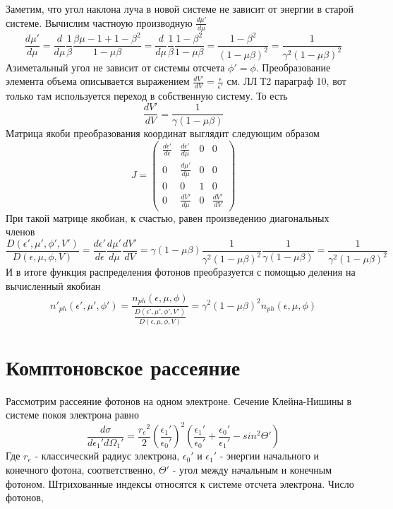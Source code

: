 \documentclass[a4paper,12pt]{jpconf}
\begin{document}
	Заметим, что угол наклона луча в новой системе не зависит от энергии в старой системе. Вычислим частноую производную $\frac{d\mu'}{d\mu}$
	\begin{equation}
		\frac{d\mu'}{d\mu}=\frac{d}{d\mu}\frac{1}{\beta}\frac{\beta\mu-1+1-\beta^2}{1-\mu\beta}=\frac{d}{d\mu}\frac{1}{\beta}\frac{1-\beta^2}{1-\mu\beta}=\frac{1-\beta^2}{(1-\mu\beta)^2}=\frac{1}{\gamma^2(1-\mu\beta)^2}
	\end{equation}
	Азиметальный угол не зависит от системы отсчета $\phi' = \phi$. Преобразование элемента объема описывается выражением $\frac{dV'}{dV} = \frac{\epsilon}{\epsilon'}$ см. ЛЛ Т2 параграф 10, вот только там используется переход в собственную систему. То есть
	\begin{equation}
		\frac{dV'}{dV} = \frac{1}{\gamma(1-\mu\beta)}
	\end{equation}
	Матрица якоби преобразования координат выглядит следующим образом
	\begin{equation}
		J=\left(
		\begin{array}{cccc}
			\frac{d\epsilon'}{d\epsilon} & \frac{d\epsilon'}{d\mu}& 0 & 0\\
			0 & \frac{d\mu'}{d\mu} & 0 & 0\\
			0 & 0 & 1 & 0\\
			0 & \frac{dV'}{d\mu} & 0 & \frac{dV'}{dV}
		\end{array}
		\right)
	\end{equation}
	При такой матрице якобиан, к счастью, равен произведению диагональных членов
	\begin{equation}\label{jacobian_ph}
		\frac{D(\epsilon',\mu',\phi',V')}{D(\epsilon,\mu,\phi,V)}=\frac{d\epsilon'}{d\epsilon}\frac{d\mu'}{d\mu}\frac{dV'}{dV}=\gamma(1-\mu\beta)\frac{1}{\gamma^2(1-\mu\beta)^2}\frac{1}{\gamma(1-\mu\beta)}=\frac{1}{\gamma^2(1-\mu\beta)^2}
	\end{equation}
	И в итоге функция распределения фотонов преобразуется с помощью деления на вычисленный якобиан
	\begin{equation}\label{distribution_ph}
		n'_{ph}(\epsilon',\mu',\phi') = \frac{n_{ph}(\epsilon,\mu,\phi)}{\frac{D(\epsilon',\mu',\phi',V')}{D(\epsilon,\mu,\phi,V)}}=\gamma^2(1-\mu\beta)^2 n_{ph}(\epsilon,\mu,\phi)
	\end{equation}
	\section{Комптоновское рассеяние}
	Рассмотрим рассеяние фотонов на одном электроне. Сечение Клейна-Нишины в системе покоя электрона равно
	\begin{equation}
		\frac{d\sigma}{d\epsilon_1'd\Omega_1'}=\frac{{r_e}^2}{2}\left(\frac{\epsilon_1'}{\epsilon_0'}\right)^2\left(\frac{\epsilon_1'}{\epsilon_0'}+\frac{\epsilon_0'}{\epsilon_1'}-sin^2\Theta'\right)
	\end{equation}
	Где $r_e$ - классический радиус электрона, $\epsilon_0'$ и $\epsilon_1'$ - энергии начального и конечного фотона, соответственно, $\Theta'$ - угол между начальным и конечным фотоном. Штрихованные индексы относятся к системе отсчета электрона.
	Число фотонов, 
\end{document}
